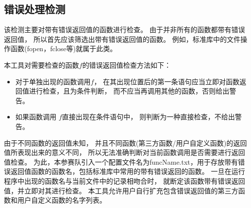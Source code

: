 \subsection{错误处理检测}
\label{sec:core:error}
该检测主要对带有错误返回值的函数进行检查。
由于并非所有的函数都带有错误返回值，
所以首先应该筛选出带有错误返回值的函数。
例如，标准库中的文件操作函数(fopen，fclose等)就属于此类。

本工具对需要检查的函数\(f\)的错误返回值检查方法如下：

\begin{itemize}
  \item
    对于单独出现的函数调用\(f\)，
在其出现位置后的第一条语句应当立即对函数返回值进行检查，且为条件判断，
而不应当再调用其他的函数，否则给出警告。
  \item
    如果函数调用 \(f\)直接出现在条件语句中，
则判断为一种直接检查，不给出警告。

\end{itemize}

由于不同函数的返回值未知，
并且不同函数(第三方函数/用户自定义函数)的返回值所表现出来的意义不同，
所以无法准确判断对当前函数调用是否需要进行返回值检查。
为此，本参赛队引入一个配置文件名为funcName.txt，用于存放带有错误返回值函数的函数名，包括标准库中常用的带有错误返回的函数。
一旦在运行程序中出现的函数名与当前文件中的记录相吻合时，
就断定该函数带有错误返回值，并立即对其进行检查。
本工具允许用户自行扩充包含错误返回值的第三方函数和用户自定义函数的名字列表。
 
